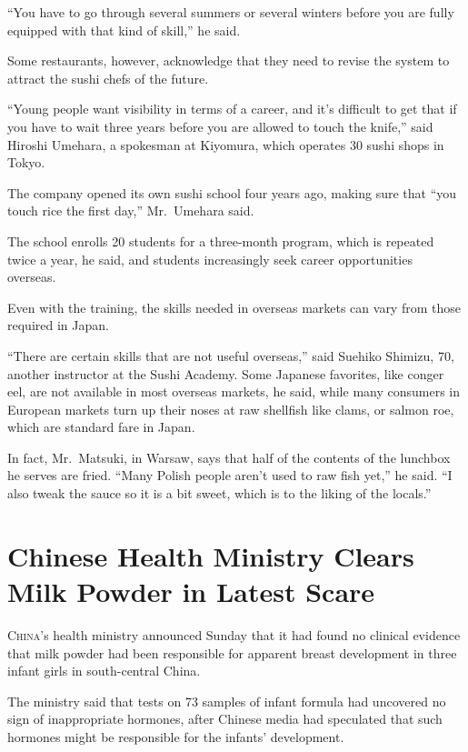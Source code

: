 ﻿\documentclass[12pt]{article}
\begin{document}
``You have to go through several summers or several winters before you are fully equipped with that
kind of skill,'' he said.

Some restaurants, however, acknowledge that they need to revise the system to attract the sushi
chefs of the future.

``Young people want visibility in terms of a career, and it's difficult to get that if you have to
wait three years before you are allowed to touch the knife,'' said Hiroshi Umehara, a spokesman at
Kiyomura, which operates 30 sushi shops in Tokyo.

The company opened its own sushi school four years ago, making sure that ``you touch rice the first
day,'' Mr.~Umehara said.

The school enrolls 20 students for a three-month program, which is repeated twice a year, he said,
and students increasingly seek career opportunities overseas.

Even with the training, the skills needed in overseas markets can vary from those required in Japan.

``There are certain skills that are not useful overseas,'' said Suehiko Shimizu, 70, another
instructor at the Sushi Academy. Some Japanese favorites, like conger eel, are not available in most
overseas markets, he said, while many consumers in European markets turn up their noses at raw
shellfish like clams, or salmon roe, which are standard fare in Japan.

In fact, Mr.~Matsuki, in Warsaw, says that half of the contents of the lunchbox he serves are fried.
``Many Polish people aren't used to raw fish yet,'' he said. ``I also tweak the sauce so it is a bit
sweet, which is to the liking of the locals.''

\section{Chinese Health Ministry Clears Milk Powder in Latest Scare}

\lettrine{C}{hina}'s health ministry announced Sunday that it had found no
clinical evidence that milk powder had been responsible for apparent breast development in three
infant girls in south-central China.

The ministry said that tests on 73 samples of infant formula had uncovered no sign of inappropriate
hormones, after Chinese media had speculated that such hormones might be responsible for the
infants' development.
\end{document}

